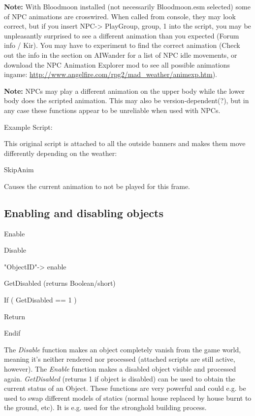 \textbf{Note:} With Bloodmoon installed (not necessarily Bloodmoon.esm
selected) some of NPC animations are crosswired. When called from
console, they may look correct, but if you insert
NPC-> PlayGroup, group, 1 into the script, you may be
unpleasantly surprised to see a different animation than you expected
(Forum info / Kir). You may have to experiment to find the correct
animation (Check out the info in the section on AIWander for a list of
NPC idle movements, or download the NPC Animation Explorer mod to see
all possible animations ingame:
\url{http://www.angelfire.com/rpg2/mad_weather/animexp.htm}).

\textbf{Note:} NPCs may play a different animation on the upper body
while the lower body does the scripted animation. This may also be
version-dependent(?), but in any case these functions appear to be
unreliable when used with NPCs.

Example Script:

This original script is attached to all the outside banners and makes
them move differently depending on the weather:



SkipAnim

Causes the current animation to not be played for this frame.

\hypertarget{enabling-and-disabling-objects}{%
\subsection{Enabling and disabling
objects}\label{enabling-and-disabling-objects}}

Enable

Disable

"ObjectID"-> enable

GetDisabled (returns Boolean/short)

If ( GetDisabled == 1 )

Return

Endif

The \emph{Disable} function makes an object completely vanish from the
game world, meaning it's neither rendered nor processed (attached
scripts are still active, however). The \emph{Enable} function makes a
disabled object visible and processed again. \emph{GetDisabled} (returns
1 if object is disabled) can be used to obtain the current status of an
Object. These functions are very powerful and could e.g. be used to swap
different models of statics (normal house replaced by house burnt to the
ground, etc). It is e.g. used for the stronghold building process.

